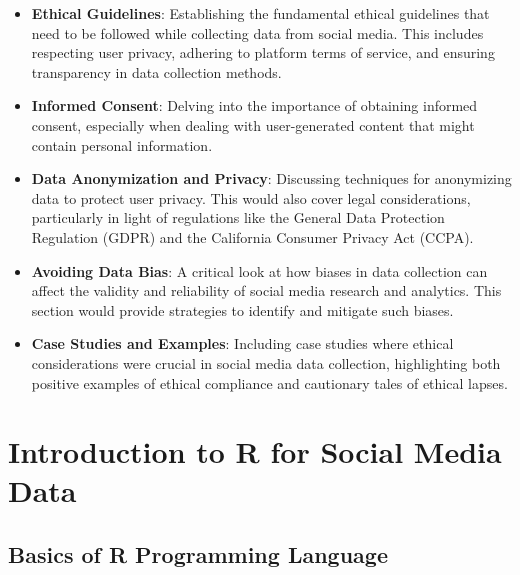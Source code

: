 \documentclass[
]{book}
\providecommand{\tightlist}{%
  \setlength{\itemsep}{0pt}\setlength{\parskip}{0pt}}
\begin{document}
\begin{itemize}
\tightlist
\item
  \textbf{Ethical Guidelines}: Establishing the fundamental ethical guidelines that need to be followed while collecting data from social media. This includes respecting user privacy, adhering to platform terms of service, and ensuring transparency in data collection methods.
\item
  \textbf{Informed Consent}: Delving into the importance of obtaining informed consent, especially when dealing with user-generated content that might contain personal information.
\item
  \textbf{Data Anonymization and Privacy}: Discussing techniques for anonymizing data to protect user privacy. This would also cover legal considerations, particularly in light of regulations like the General Data Protection Regulation (GDPR) and the California Consumer Privacy Act (CCPA).
\item
  \textbf{Avoiding Data Bias}: A critical look at how biases in data collection can affect the validity and reliability of social media research and analytics. This section would provide strategies to identify and mitigate such biases.
\item
  \textbf{Case Studies and Examples}: Including case studies where ethical considerations were crucial in social media data collection, highlighting both positive examples of ethical compliance and cautionary tales of ethical lapses.
\end{itemize}

\hypertarget{introduction-to-r-for-social-media-data}{%
\chapter{Introduction to R for Social Media Data}\label{introduction-to-r-for-social-media-data}}

\hypertarget{basics-of-r-programming-language}{%
\section*{Basics of R Programming Language}\label{basics-of-r-programming-language}}
\end{document}
